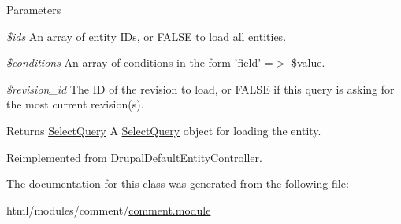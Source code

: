 \begin{DoxyParams}{Parameters}
\item[{\em \$ids}]An array of entity IDs, or FALSE to load all entities. \item[{\em \$conditions}]An array of conditions in the form 'field' =$>$ \$value. \item[{\em \$revision\_\-id}]The ID of the revision to load, or FALSE if this query is asking for the most current revision(s).\end{DoxyParams}
\begin{DoxyReturn}{Returns}
\hyperlink{classSelectQuery}{SelectQuery} A \hyperlink{classSelectQuery}{SelectQuery} object for loading the entity. 
\end{DoxyReturn}


Reimplemented from \hyperlink{classDrupalDefaultEntityController_aaa882d053aa4e04e2816b0093b79b0f8}{DrupalDefaultEntityController}.

The documentation for this class was generated from the following file:\begin{DoxyCompactItemize}
\item 
html/modules/comment/\hyperlink{comment_8module}{comment.module}\end{DoxyCompactItemize}
